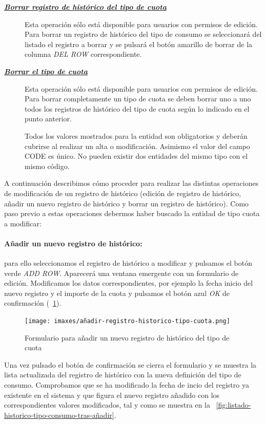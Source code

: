 \begin{description}
\item[\underline{\textsl{\textbf{Borrar registro de histórico del tipo de cuota}}}] Esta operación sólo está disponible para usuarios con permisos de edición.
Para borrar un registro de histórico del tipo de consumo se seleccionará del listado el registro a borrar y se pulsará el botón amarillo de borrar de la columna \textit{DEL ROW} correspondiente.

\item[\underline{\textsl{\textbf{Borrar el tipo de cuota}}}] Esta operación sólo está disponible para usuarios con permisos de edición.
Para borrar completamente un tipo de cuota se deben borrar uno a uno todos los registros de histórico del tipo de cuota según lo indicado en el punto anterior. 

Todos los valores mostrados para la entidad son obligatorios y deberán cubrirse al realizar un alta o modificación. Asimismo el valor del campo CODE es único. No pueden existir dos entidades del mismo tipo con el mismo código.
\end{description}

A continuación describimos cómo proceder para realizar las distintas operaciones de modificación de un registro de histórico (edición de registro de histórico, añadir un nuevo registro de histórico y borrar un registro de histórico). Como paso previo a estas operaciones debermos haber buscado la entidad de tipo cuota a modificar:


\paragraph{Añadir un nuevo registro de histórico:} para ello seleccionamos el registro de histórico a modificar y pulsamos el botón verde \emph{ADD ROW}. Aparecerá una ventana emergente con un formulario de edición. Modificamos los datos correspondientes, por ejemplo la fecha inicio del nuevo registro y el importe de la cuota y pulsamos el botón azul \emph{OK} de confirmación (\figurename~\ref{fig:añadir-registro-historico-tipo-cuota}).

\begin{figure}
  \centering
  \texttt{[image: imaxes/añadir-registro-historico-tipo-cuota.png]}
  \caption{Formulario para añadir un nuevo registro de histórico del tipo de cuota}
  \label{fig:añadir-registro-historico-tipo-cuota}
\end{figure}


Una vez pulsado el botón de confirmación se cierra el formulario y se muestra la lista actualizada del registro de histórico con la nueva definición del tipo de consumo. Comprobamos que se ha modificado la fecha de incio del registro ya existente en el sistema y que figura el nuevo registro añadido con los correspondientes valores modificados, tal y como se muestra en la \figurename~\ref{fig:listado-historico-tipo-consumo-tras-añadir}.

